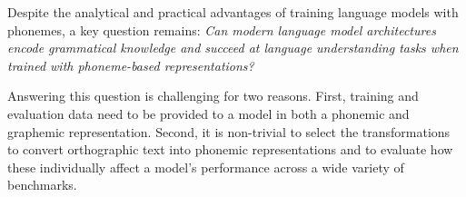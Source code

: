


\vspace{.3cm}

Despite the analytical and practical advantages of training language models with phonemes, a key question remains: \emph{Can modern language model architectures encode grammatical knowledge and succeed at language understanding tasks when trained with phoneme-based representations?} 

Answering this question is challenging for two reasons. First, training and evaluation data need to be provided to a model in both a phonemic and graphemic representation. Second, it is non-trivial to select the transformations to convert orthographic text into phonemic representations and to evaluate how these individually affect a model's performance across a wide variety of benchmarks.



